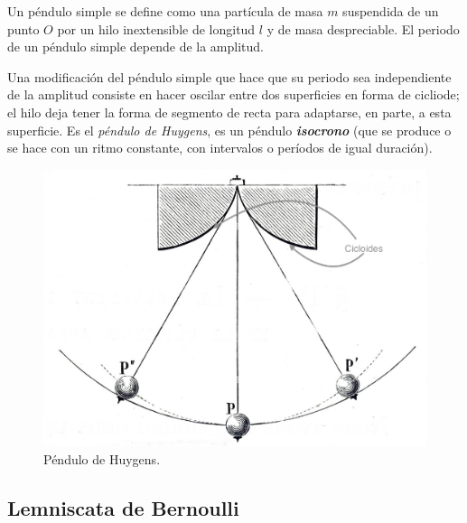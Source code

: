 \begin{small}	
Un péndulo simple se define como una partícula de masa $m$ suspendida de un punto $O$ por un hilo inextensible de longitud $l$ y de masa despreciable. El periodo de un péndulo simple depende de la amplitud.

\begin{multicols}{2}
Una modificación del péndulo simple que hace que su periodo sea independiente de la amplitud consiste en hacer oscilar entre dos superficies en forma de cicliode; el hilo deja tener la forma de segmento de recta para adaptarse, en parte, a esta superficie. Es el \emph{péndulo de Huygens}, es un péndulo \textbf{\emph{isocrono}} (que se produce o se hace con un ritmo constante, con intervalos o períodos de igual duración).

\begin{figure}[H]
	\centering
	\includegraphics[width=.3\textwidth]{img-polares/polares10.png}
	\caption*{\footnotesize{Péndulo de Huygens}\normalsize{.}}
	\end{figure}
	
\end{multicols}
\end{small}

\color{black}


\subsection{Lemniscata de Bernoulli}
\vspace{-5mm}


\vspace{5mm}

